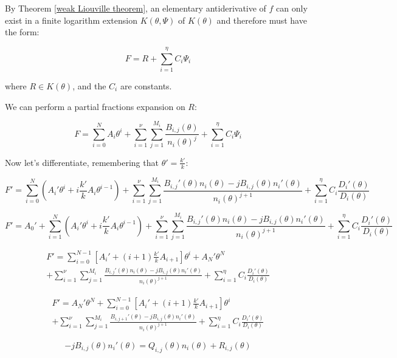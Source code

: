 
\proof

By Theorem \ref{weak Liouville theorem}, an elementary antiderivative
of $f$ can only exist in a finite logarithm extension $K(\theta, \Psi)$
of $K(\theta)$ and therefore must have the form:

$$F = R + \sum_{i=1}^\eta C_i \Psi_i$$

where $R \in K(\theta)$, and the $C_i$ are constants.

We can perform a partial fractions expansion on $R$:

$$F = \sum_{i=0}^N A_i \theta^i
+ \sum_{i=1}^\nu \sum_{j=1}^{M_i} \frac{B_{i,j}(\theta)}{n_i(\theta)^j}
+ \sum_{i=1}^\eta C_i \Psi_i$$

Now let's differentiate, remembering that $\theta' = \frac{k'}{k}$:

$$F' = \sum_{i=0}^N ( A_i' \theta^i + i \frac{k'}{k} A_i \theta^{i-1} )
+ \sum_{i=1}^\nu \sum_{j=1}^{M_i} \frac{B_{i,j}'(\theta) n_i(\theta) - j B_{i,j}(\theta) n_i'(\theta)}{n_i(\theta)^{j+1}}
  + \sum_{i=1}^\eta C_i \frac{D_i'(\theta)}{D_i(\theta)}$$

$$F' = A_0' + \sum_{i=1}^N ( A_i' \theta^i + i \frac{k'}{k} A_i \theta^{i-1} )
+ \sum_{i=1}^\nu \sum_{j=1}^{M_i} \frac{B_{i,j}'(\theta) n_i(\theta) - j B_{i,j}(\theta) n_i'(\theta)}{n_i(\theta)^{j+1}}
  + \sum_{i=1}^\eta C_i \frac{D_i'(\theta)}{D_i(\theta)}$$

\begin{multline*}
F' = \sum_{i=0}^{N-1} \left[ A_i' + (i+1) \frac{k'}{k} A_{i+1} \right] \theta^{i} + A_N' \theta^N \\
+ \sum_{i=1}^\nu \sum_{j=1}^{M_i} \frac{B_{i,j}'(\theta) n_i(\theta) - j B_{i,j}(\theta) n_i'(\theta)}{n_i(\theta)^{j+1}}
  + \sum_{i=1}^\eta C_i \frac{D_i'(\theta)}{D_i(\theta)}
\end{multline*}

\begin{multline*}
F' = A_N' \theta^N + \sum_{i=0}^{N-1} \left[ A_i' + (i+1) \frac{k'}{k} A_{i+1} \right] \theta^{i} \\
+ \sum_{i=1}^\nu \sum_{j=1}^{M_i} \frac{B_{i,j+1}'(\theta) - j B_{i,j}(\theta) n_i'(\theta)}{n_i(\theta)^{j+1}}
  + \sum_{i=1}^\eta C_i \frac{D_i'(\theta)}{D_i(\theta)}
\end{multline*}

$$ - j B_{i,j}(\theta) n_i'(\theta) = Q_{i,j}(\theta) n_i(\theta) + R_{i,j}(\theta)$$

